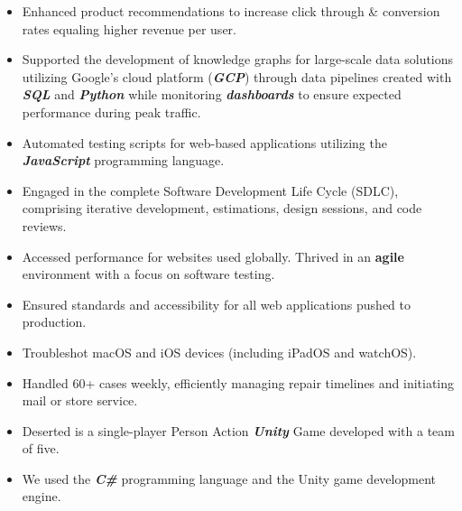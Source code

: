 \documentclass[10pt,a4paper,ragged2e,withhyper]{altacv}
\begin{document}
\begin{paracol}{2}

\begin{itemize}
\item Enhanced product recommendations to increase click through \& conversion rates equaling higher revenue per user. 
\item Supported the development of knowledge graphs for large-scale data solutions utilizing Google’s cloud platform (\textbf{\textit{GCP}}) through data pipelines created with \textbf{\textit{SQL}} and \textbf{\textit{Python}} while monitoring \textbf{\textit{dashboards}} to ensure expected performance during peak traffic.
\item Automated testing scripts for web-based applications utilizing the \textbf{\textit{JavaScript}} programming language. 
\item Engaged in the complete Software Development Life Cycle (SDLC), comprising iterative development, estimations, design sessions, and code reviews.
\end{itemize}

\divider

\begin{itemize}
\item Accessed performance for websites used globally. Thrived in an \textbf{agile} environment with a focus on software testing. 
\item Ensured standards and accessibility for all web applications pushed to production.
\end{itemize}

\divider

\begin{itemize}
\item Troubleshot macOS and iOS devices (including iPadOS and watchOS). 
\item Handled 60+ cases weekly, efficiently managing repair timelines and initiating mail or store service.
\end{itemize}


\begin{itemize}
\item Deserted is a single-player Person Action \textbf{\textit{Unity}} Game developed with a team of five.
\item We used the \textbf{\textit{C\#}} programming language and the Unity game development engine.
\end{itemize}


\end{paracol}
\end{document}
